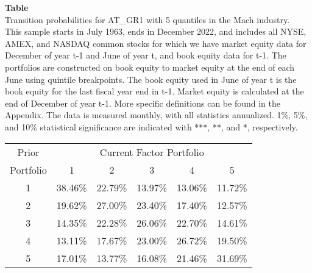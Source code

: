 \begin{table*}[ht!]
\raggedright
{}
\label{tab: transition_probs_AT_GR1_Mach_with_5_quantiles}
\textbf{Table \thetable} \\
Transition probabilities for AT_GR1 with 5 quantiles in the Mach industry. \\
\hspace*{1em}This sample starts in July 1963, ends in December 2022, and includes all NYSE, AMEX, and NASDAQ common stocks for which we have market equity data for December of year t-1 and June of year t, and book equity data for t-1. The portfolios are constructed on book equity to market equity at the end of each June using quintile breakpoints.  The book equity used in June of year t is the book equity for the last fiscal year end in t-1.  Market equity is calculated at the end of December of year t-1.  More specific definitions can be found in the Appendix.  The data is measured monthly, with all statistics annualized.  1\%, 5\%, and 10\% statistical significance are indicated with ***, **, and *, respectively. \\
\vspace{0.5em}
\centering
\begin{adjustbox}{max width=\textwidth}
\begin{tabular}{@{}cccccc@{}}
\toprule
Prior & \multicolumn{5}{c}{Current Factor Portfolio} \\
Portfolio & 1 & 2 & 3 & 4 & 5 \\
\midrule
1 & 38.46\% & 22.79\% & 13.97\% & 13.06\% & 11.72\% \\
2 & 19.62\% & 27.00\% & 23.40\% & 17.40\% & 12.57\% \\
3 & 14.35\% & 22.28\% & 26.06\% & 22.70\% & 14.61\% \\
4 & 13.11\% & 17.67\% & 23.00\% & 26.72\% & 19.50\% \\
5 & 17.01\% & 13.77\% & 16.08\% & 21.46\% & 31.69\% \\
\bottomrule
\end{tabular}
\end{adjustbox}
\end{table*}
